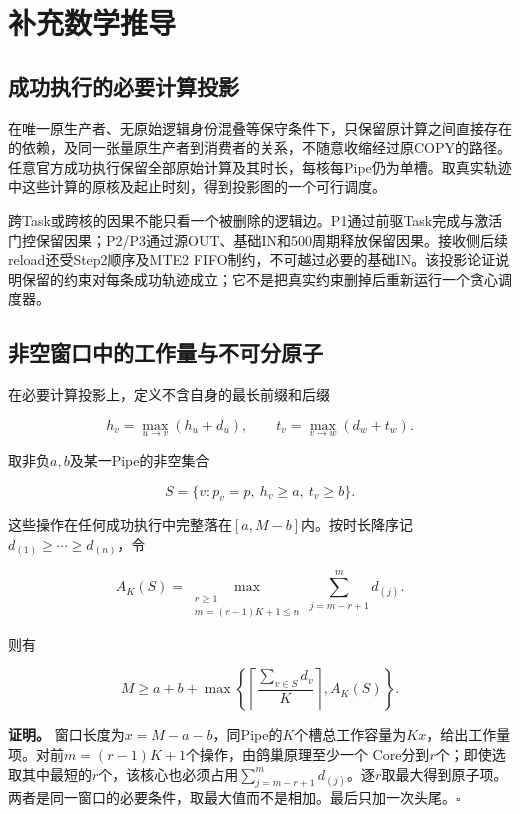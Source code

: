 \documentclass[anonymous,notoc]{gmcm2026}
\begin{document}
\appendix
\section{补充数学推导}\label{ux8865ux5145ux6570ux5b66ux63a8ux5bfc}

\subsection{成功执行的必要计算投影}\label{ux6210ux529fux6267ux884cux7684ux5fc5ux8981ux8ba1ux7b97ux6295ux5f71}

在唯一原生产者、无原始逻辑身份混叠等保守条件下，只保留原计算之间直接存在的依赖，及同一张量原生产者到消费者的关系，不随意收缩经过原COPY的路径。任意官方成功执行保留全部原始计算及其时长，每核每Pipe仍为单槽。取真实轨迹中这些计算的原核及起止时刻，得到投影图的一个可行调度。

跨Task或跨核的因果不能只看一个被删除的逻辑边。P1通过前驱Task完成与激活门控保留因果；P2/P3通过源OUT、基础IN和500周期释放保留因果。接收侧后续reload还受Step2顺序及MTE2 FIFO制约，不可越过必要的基础IN。该投影论证说明保留的约束对每条成功轨迹成立；它不是把真实约束删掉后重新运行一个贪心调度器。

\subsection{非空窗口中的工作量与不可分原子}\label{ux975eux7a7aux7a97ux53e3ux4e2dux7684ux5de5ux4f5cux91cfux4e0eux4e0dux53efux5206ux539fux5b50}

在必要计算投影上，定义不含自身的最长前缀和后缀

\[h_v=\max_{u\to v}(h_u+d_u),\qquad t_v=\max_{v\to w}(d_w+t_w).\]

取非负\(a,b\)及某一Pipe的非空集合

\[S=\{v:p_v=p,\ h_v\ge a,\ t_v\ge b\}.\]

这些操作在任何成功执行中完整落在\([a,M-b]\)内。按时长降序记\(d_{(1)}\ge\cdots\ge d_{(n)}\)，令

\[A_K(S)=\max_{\substack{r\ge1\\m=(r-1)K+1\le n}}\sum_{j=m-r+1}^{m}d_{(j)}.\]

则有

\[M\ge a+b+\max\left\{\left\lceil\frac{\sum_{v\in S}d_v}{K}\right\rceil,A_K(S)\right\}.\]

\textbf{证明。} 窗口长度为\(x=M-a-b\)，同Pipe的\(K\)个槽总工作容量为\(Kx\)，给出工作量项。对前\(m=(r-1)K+1\)个操作，由鸽巢原理至少一个 Core分到\(r\)个；即使选取其中最短的\(r\)个，该核心也必须占用\(\sum_{j=m-r+1}^{m}d_{(j)}\)。逐\(r\)取最大得到原子项。两者是同一窗口的必要条件，取最大值而不是相加。最后只加一次头尾。\(\square\)
\end{document}
